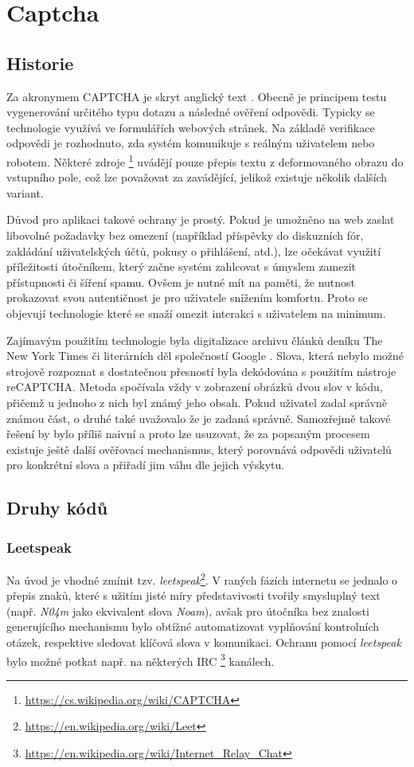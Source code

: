 \documentclass[
  field=ainfp,
  master=true,
  biblatex,
  sourcecodes=false,
  theorems=false,
  glossaries,
  index
]{kidiplom}
\begin{document}
\section{Captcha}
\subsection{Historie}
Za akronymem CAPTCHA je skryt anglický text . Obecně je principem testu vygenerování určitého typu dotazu a následné ověření odpovědi. Typicky se technologie využívá ve formulářích webových stránek. Na základě verifikace odpovědi je rozhodnuto, zda systém komunikuje s reálným uživatelem nebo robotem. Některé zdroje \footnote{\url{https://cs.wikipedia.org/wiki/CAPTCHA}} uvádějí pouze přepis textu z deformovaného obrazu do vstupního pole, což lze považovat za zavádějící, jelikož existuje několik dalších  variant. 

Důvod pro aplikaci takové ochrany je prostý. Pokud je umožněno na web zaslat libovolné požadavky bez omezení (například příspěvky do diskuzních fór, zakládání uživatelských účtů, pokusy o přihlášení, atd.), lze očekávat využití příležitosti útočníkem, který začne systém zahlcovat s úmyslem zamezit přístupnosti či šíření spamu. Ovšem je nutné mít na paměti, že nutnost prokazovat svou autentičnost je pro uživatele snížením komfortu. Proto se objevují technologie které se snaží omezit interakci s uživatelem na minimum. 

Zajímavým použitím technologie byla digitalizace archivu článků deníku The New York Times či literárních děl společností Google \cite{web:techcrunch}. Slova, která nebylo možné strojově rozpoznat s dostatečnou přesností byla dekódována s použitím nástroje reCAPTCHA. Metoda spočívala vždy v zobrazení obrázků dvou slov v kódu, přičemž u jednoho z nich byl známý jeho obsah. Pokud uživatel zadal správně známou část, o druhé také uvažovalo že je zadaná správně. Samozřejmě takové řešení by bylo příliš naivní a proto lze usuzovat, že za popsaným procesem existuje ještě další ověřovací mechanismus, který porovnává odpovědi uživatelů pro konkrétní slova a přiřadí jim váhu dle jejich výskytu. 
\subsection{Druhy kódů}
 
\subsubsection*{Leetspeak} 
Na úvod je vhodné zmínit tzv. \textit{leetspeak}\footnote{\url{https://en.wikipedia.org/wiki/Leet}}. V raných fázích internetu se jednalo o přepis znaků, které s užitím jisté míry představivosti tvořily smysluplný text (např. \textit{N04m} jako ekvivalent slova \textit{Noam}), avšak pro útočníka bez znalosti generujícího mechanismu bylo obtížné automatizovat vyplňování kontrolních otázek, respektive sledovat klíčová slova v komunikaci. Ochranu pomocí \textit{leetspeak} bylo možné potkat např. na některých IRC \footnote{\url{https://en.wikipedia.org/wiki/Internet\_Relay\_Chat}} kanálech.
 
\end{document}
